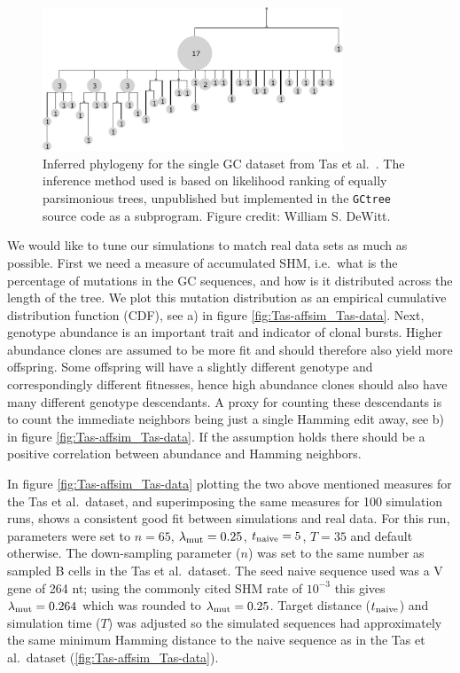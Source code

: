 \begin{figure}[!ht]
    \centering
    \includegraphics[width=0.8\textwidth]{figures/Tas_tree.pdf}
    \caption{
        \label{fig:Tas_tree}
        Inferred phylogeny for the single GC dataset from Tas et al.\ \cite{tas2016visualizing}.
        The inference method used is based on likelihood ranking of equally parsimonious trees, unpublished but implemented in the \texttt{GCtree} source code as a subprogram.
        Figure credit: William S. DeWitt.
    }
\end{figure}

We would like to tune our simulations to match real data sets as much as possible.
First we need a measure of accumulated SHM, i.e.\ what is the percentage of mutations in the GC sequences, and how is it distributed across the length of the tree.
We plot this mutation distribution as an empirical cumulative distribution function (CDF), see a) in figure \ref{fig:Tas-affsim_Tas-data}.
Next, genotype abundance is an important trait and indicator of clonal bursts.
Higher abundance clones are assumed to be more fit and should therefore also yield more offspring.
Some offspring will have a slightly different genotype and correspondingly different fitnesses, hence high abundance clones should also have many different genotype descendants.
A proxy for counting these descendants is to count the immediate neighbors being just a single Hamming edit away, see b) in figure \ref{fig:Tas-affsim_Tas-data}.
If the assumption holds there should be a positive correlation between abundance and Hamming neighbors.

In figure \ref{fig:Tas-affsim_Tas-data} plotting the two above mentioned measures for the Tas et al.\ dataset, and superimposing the same measures for 100 simulation runs, shows a consistent good fit between simulations and real data.
For this run, parameters were set to $n=65$, $\lambda_{\text{mut}}=0.25$, $t_{\text{naive}}=5$, $T=35$ and default otherwise.
The down-sampling parameter ($n$) was set to the same number as sampled B cells in the Tas et al.\ dataset.
The seed naive sequence used was a V gene of 264 nt; using the commonly cited SHM rate of $10^{-3}$ \cite{victora2012germinal} this gives $\lambda_{\text{mut}}=0.264$ which was rounded to $\lambda_{\text{mut}}=0.25$.
Target distance ($t_{\text{naive}}$) and simulation time ($T$) was adjusted so the simulated sequences had approximately the same minimum Hamming distance to the naive sequence as in the Tas et al.\ dataset (\ref{fig:Tas-affsim_Tas-data}).

